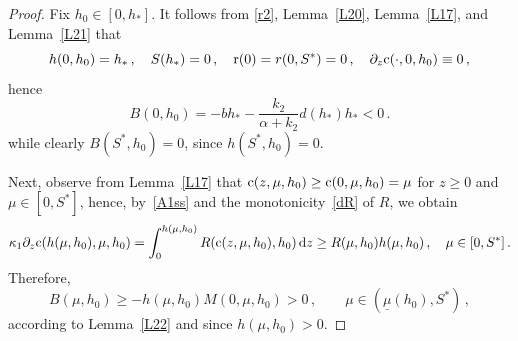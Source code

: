 \documentclass[reqno,11pt]{amsart}
\numberwithin{equation}{section}
\newcommand{\rd}{\mathrm{d}}
\begin{document}
\begin{proof}
Fix $h_0\in [0,h_*]$. It follows from \eqref{r2}, Lemma~\ref{L20}, Lemma~\ref{L17}, and Lemma~\ref{L21} that
$$
h(0,h_0)=h_*\,,\quad S(h_*)=0\,,\quad {\rm r}(0)=r(0,S^*)=0\,, \quad \partial_z {\rm c}(\cdot,0,h_0)\equiv 0\,,
$$ 
hence
$$
B(0,h_0)=-bh_*-\frac{k_2}{\alpha+k_2}d(h_*)h_*<0\,.
$$
while clearly $B(S^*,h_0)=0$, since $h(S^*,h_0)=0$.  

Next, observe from Lemma~\ref{L17} that ${\rm c}(z,\mu,h_0)\ge{\rm c}(0,\mu,h_0)=\mu$ for $z\ge 0$ and $\mu\in[0,S^*]$, hence, by~\eqref{A1ss} and the monotonicity~\eqref{dR} of $R$,  we obtain
\[
\kappa_1\partial_z{\rm c}(h(\mu,h_0),\mu,h_0)=\int_0^{h(\mu,h_0)}R({\rm c}(z,\mu,h_0),h_0)\,\rd z\ge R(\mu,h_0)h(\mu,h_0)\,,\quad \mu\in[0,S^*]\,.
\]
Therefore, 
$$
B(\mu,h_0)\ge -h(\mu,h_0)M(0,\mu,h_0)>0\,,\qquad \mu\in(\underline\mu(h_0),S^*)\,,
$$
according to Lemma~\ref{L22} and since $h(\mu,h_0)>0$. 


\end{proof}
\end{document}
